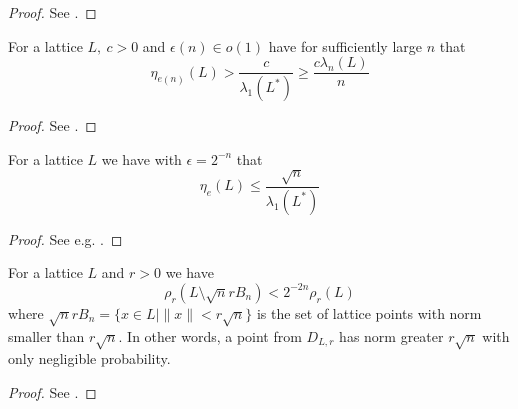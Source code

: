 \documentclass{report}
\newcommand{\noqed}{\phantom\qedhere}
\begin{document}
\begin{proof} \noqed
See \cite[3.9]{Reg}.
\end{proof}

\lemma
\label{smoothing_parameter_lower_bound}
For a lattice $L,\ c > 0$ and $\epsilon(n) \in o(1)$ have for sufficiently large $n$ that
\begin{equation}
\eta_{e(n)}(L) > \frac c {\lambda_1(L^*)} \geq \frac {c\lambda_n(L)} n \nonumber
\end{equation}

\begin{proof} \noqed
See \cite[2.13]{Reg}.
\end{proof}

\lemma
\label{smoothing_parameter_upper_bound}
For a lattice $L$ we have with $\epsilon = 2^{-n}$ that
\begin{equation}
\eta_{e}(L) \leq \frac {\sqrt{n}} {\lambda_1(L^*)} \nonumber
\end{equation}

\begin{proof} \noqed
See e.g. \cite[2.11]{Reg}.
\end{proof}

\lemma
\label{gaussian_length_bound}
For a lattice $L$ and $r > 0$ we have
\begin{equation}
\rho_r(L \setminus \sqrt{n}rB_n) < 2^{-2n} \rho_r(L) \nonumber
\end{equation}
where $\sqrt{n}rB_n = \{x \in L | \|x\| < r\sqrt{n}\}$ is the set of lattice points with norm smaller than $r\sqrt{n}$. In other words, a point from $D_{L, r}$ has norm greater $r\sqrt{n}$ with only negligible probability.

\begin{proof} \noqed
See \cite[1.5(i)]{Ban}.
\end{proof}
\end{document}
